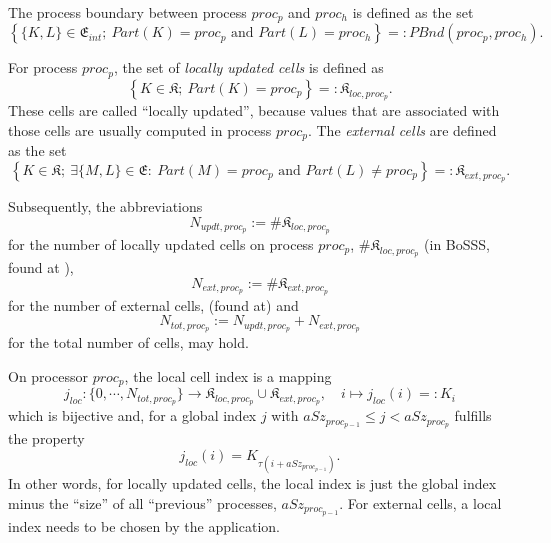 \begin{myDef}
The process boundary between process $proc_p$ and $proc_h$ is defined as
the set
\[
  \left\{
      \{K,L\} \in \mathfrak{E}_{int};
      \
      Part(K) = proc_p \textrm{ and } Part(L) = proc_h
  \right\}
  =: PBnd(proc_p,proc_h).
\]
\end{myDef}

\begin{myDef}
For process $proc_p$, the set of \emph{locally updated cells}
is defined as
\[
  \left\{ K \in \mathfrak{K}; \ Part(K) = proc_p \right\} =: \mathfrak{K}_{loc,proc_p}.
\]
These cells are called ``locally updated'', because values that are associated with those
cells are usually computed in process $proc_p$.
The \emph{external cells} are defined as the set
\[
  \left\{
     K \in \mathfrak{K};
     \
     \exists \{M,L\} \in \mathfrak{E}: \ Part(M) = proc_p \textrm{ and } Part(L) \neq proc_p
  \right\}
  =: \mathfrak{K}_{ext,proc_p}.
\]
\end{myDef}

\begin{myNot}
Subsequently, the abbreviations
\[
 N_{updt,proc_p} := \# \mathfrak{K}_{loc,proc_p}
\]
for the number of locally updated cells on process $proc_p$, $\# \mathfrak{K}_{loc,proc_p}$
(in BoSSS, found at ),
\[
 N_{ext,proc_p} := \# \mathfrak{K}_{ext,proc_p}
\]
for the number of external cells,
(found at)
and
\[
  N_{tot,proc_p} := N_{updt,proc_p} + N_{ext,proc_p}
\]
for the total number of cells,
may hold.
\end{myNot}

\begin{myDef}
On processor $proc_p$, the local cell index is a mapping
\[
 j_{loc}:
 \{0,\cdots,N_{tot,proc_p} \}
 \rightarrow
 \mathfrak{K}_{loc,proc_p} \cup \mathfrak{K}_{ext,proc_p},
 \quad
 i \mapsto j_{loc}(i) =: K_i
\]
which is bijective and,
for a global index $j$ with $aSz_{proc_{p-1}} \leq j < aSz_{proc_{p}}$
fulfills the
property
\[
    j_{loc}(i) = K_{\tau \left( i+aSz_{proc_{p-1}} \right)}.
\]
In other words, for locally updated cells, the local index is just
the global index minus the ``size'' of all ``previous'' processes, $aSz_{proc_{p-1}}$.
For external cells, a local index needs to be chosen by the application.
\end{myDef}

